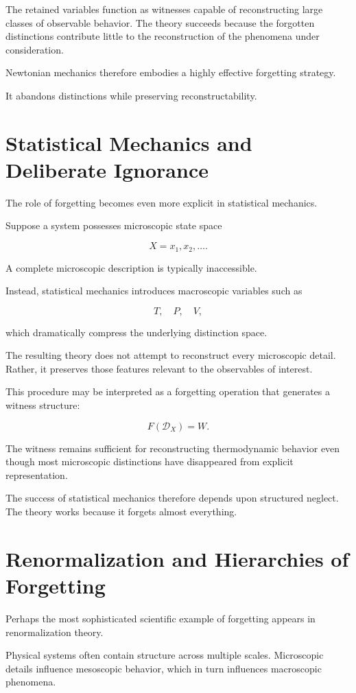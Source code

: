 \documentclass[12pt,oneside]{book}
\theoremstyle{plain} \newtheorem{theorem}{Theorem}[chapter] \newtheorem{lemma}[theorem]{Lemma} \newtheorem{proposition}[theorem]{Proposition} \newtheorem{corollary}[theorem]{Corollary}
\theoremstyle{definition} \newtheorem{definition}[theorem]{Definition} \newtheorem{axiom}[theorem]{Axiom} \newtheorem{construction}[theorem]{Construction}
\theoremstyle{remark} \newtheorem{remark}[theorem]{Remark} \newtheorem{example}[theorem]{Example}
\newcommand{\D}{\mathcal{D}} \newcommand{\R}{\mathcal{R}} \newcommand{\F}{\mathcal{F}} \newcommand{\U}{\mathcal{U}} \newcommand{\M}{\mathcal{M}} \newcommand{\G}{\Gamma}
\begin{document}
The retained variables function as witnesses capable of reconstructing large classes of observable behavior. The theory succeeds because the forgotten distinctions contribute little to the reconstruction of the phenomena under consideration.

Newtonian mechanics therefore embodies a highly effective forgetting strategy.

It abandons distinctions while preserving reconstructability.

\section{Statistical Mechanics and Deliberate Ignorance}

The role of forgetting becomes even more explicit in statistical mechanics.

Suppose a system possesses microscopic state space

\[
X
=
{x_1,x_2,\ldots}.
\]

A complete microscopic description is typically inaccessible.

Instead, statistical mechanics introduces macroscopic variables such as

\[
T,
\quad
P,
\quad
V,
\]

which dramatically compress the underlying distinction space.

The resulting theory does not attempt to reconstruct every microscopic detail. Rather, it preserves those features relevant to the observables of interest.

This procedure may be interpreted as a forgetting operation that generates a witness structure:

\[
F(\D_X)
=
W.
\]

The witness remains sufficient for reconstructing thermodynamic behavior even though most microscopic distinctions have disappeared from explicit representation.

The success of statistical mechanics therefore depends upon structured neglect. The theory works because it forgets almost everything.

\section{Renormalization and Hierarchies of Forgetting}

Perhaps the most sophisticated scientific example of forgetting appears in renormalization theory.

Physical systems often contain structure across multiple scales. Microscopic details influence mesoscopic behavior, which in turn influences macroscopic phenomena.
\end{document}
